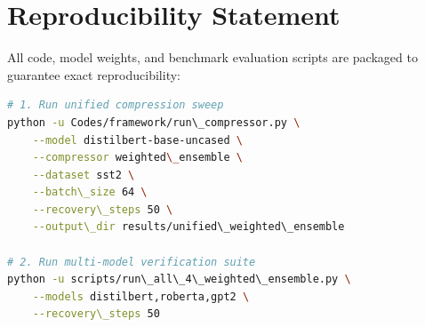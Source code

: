 \section{Reproducibility Statement}
All code, model weights, and benchmark evaluation scripts are packaged to guarantee exact reproducibility:
\begin{lstlisting}[language=bash]
# 1. Run unified compression sweep
python -u Codes/framework/run\_compressor.py \
    --model distilbert-base-uncased \
    --compressor weighted\_ensemble \
    --dataset sst2 \
    --batch\_size 64 \
    --recovery\_steps 50 \
    --output\_dir results/unified\_weighted\_ensemble

# 2. Run multi-model verification suite
python -u scripts/run\_all\_4\_weighted\_ensemble.py \
    --models distilbert,roberta,gpt2 \
    --recovery\_steps 50
\end{lstlisting}
